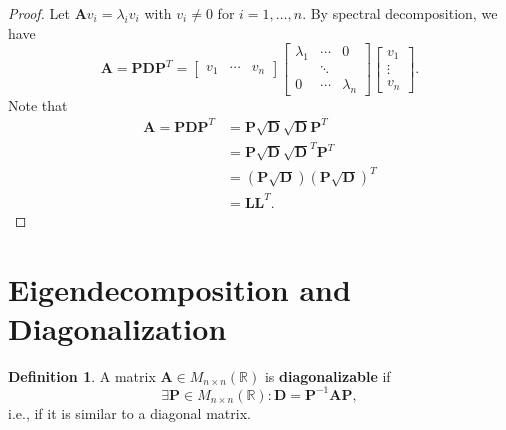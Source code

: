 \documentclass[12pt,openany]{book}
\theoremstyle{definition}
\newtheorem{definition}{Definition}[chapter]
\newcommand{\R}{\mathbb{R}}
\newcommand{\ie}{\textnormal{i.e.}}
\newcommand{\by}{\times}
\begin{document}
	\begin{proof}
		Let $\textbf{A}v_i=\lambda_iv_i$ with $v_i\neq 0$ for $i=1,\dots,n$. By spectral decomposition, we have \[
		\textbf{A}=\textbf{P}\textbf{D}\textbf{P}^T=\begin{bmatrix}
			v_1&\cdots& v_n
		\end{bmatrix}\begin{bmatrix}
		\lambda_1&\cdots&0\\&\ddots&\\0&\cdots&\lambda_n
	\end{bmatrix}\begin{bmatrix}
	v_1\\ \vdots\\ v_n 
\end{bmatrix}.
		\] Note that \begin{align*}
			\textbf{A}=\textbf{PDP}^T&=\textbf{P}\sqrt{\textbf{D}}\sqrt{\textbf{D}}\textbf{P}^T\\
			&=\textbf{P}\sqrt{\textbf{D}}\sqrt{\textbf{D}}^T\textbf{P}^T\\
			&=(\textbf{P}\sqrt{\textbf{D}})(\textbf{P}\sqrt{\textbf{D}})^T\\
			&=\textbf{L}\textbf{L}^T.
		\end{align*}
	\end{proof}

	\section{Eigendecomposition and Diagonalization}
	\begin{tcolorbox}[colframe=defcolor,title={\color{white}\bf Diagonalizable}]
		\begin{definition}
			A matrix \(\textbf{A}\in M_{n\by n}(\R)\) is \textbf{diagonalizable} if \[
			\exists\textbf{P}\in M_{n\by n}(\R):\textbf{D}=\textbf{P}^{-1}\textbf{A}\textbf{P},
			\] \ie, if it is similar to a diagonal matrix.
		\end{definition}
	\end{tcolorbox}
	\vspace{8pt}
	
\end{document}
